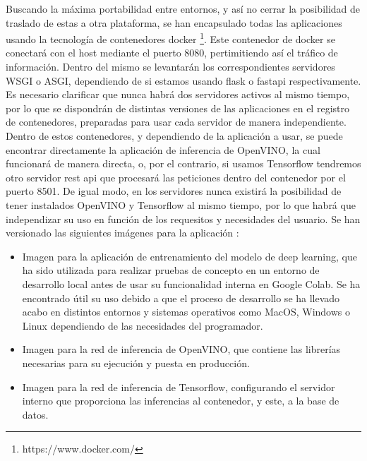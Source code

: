 Buscando la máxima portabilidad entre entornos, y así no cerrar la posibilidad de traslado de estas a otra plataforma, se han encapsulado todas las aplicaciones usando la tecnología de contenedores docker \footnote{https://www.docker.com/}.
Este contenedor de docker se conectará con el host mediante el puerto 8080, pertimitiendo así el tráfico de información.
Dentro del mismo se levantarán los correspondientes servidores WSGI o ASGI, dependiendo de si estamos usando flask o fastapi respectivamente.
Es necesario clarificar que nunca habrá dos servidores activos al mismo tiempo, por lo que se dispondrán de distintas versiones de las aplicaciones en el registro de contenedores, preparadas para usar cada servidor de manera independiente.
Dentro de estos contenedores, y dependiendo de la aplicación a usar, se puede encontrar directamente la aplicación de inferencia de OpenVINO, la cual funcionará de manera directa, o, por el contrario, si usamos Tensorflow tendremos otro servidor rest api que procesará las peticiones dentro del contenedor por el puerto 8501.
De igual modo, en los servidores nunca existirá la posibilidad de tener instalados OpenVINO y Tensorflow al mismo tiempo, por lo que habrá que independizar su uso en función de los requesitos y necesidades del usuario.
Se han versionado las siguientes imágenes para la aplicación :
\begin{itemize}
    \item Imagen para la aplicación de entrenamiento del modelo de deep learning, que ha sido utilizada para realizar pruebas de concepto en un entorno de desarrollo local antes de usar su funcionalidad
    interna en Google Colab.
    Se ha encontrado útil su uso debido a que el proceso de desarrollo se ha llevado acabo en distintos entornos y sistemas operativos como MacOS, Windows o Linux dependiendo de las necesidades del programador.
    \item Imagen para la red de inferencia de OpenVINO, que contiene las librerías necesarias para su ejecución y puesta en producción.
    \item Imagen para la red de inferencia de Tensorflow, configurando el servidor interno que proporciona las inferencias al contenedor, y este, a la base de datos.
\end{itemize}

